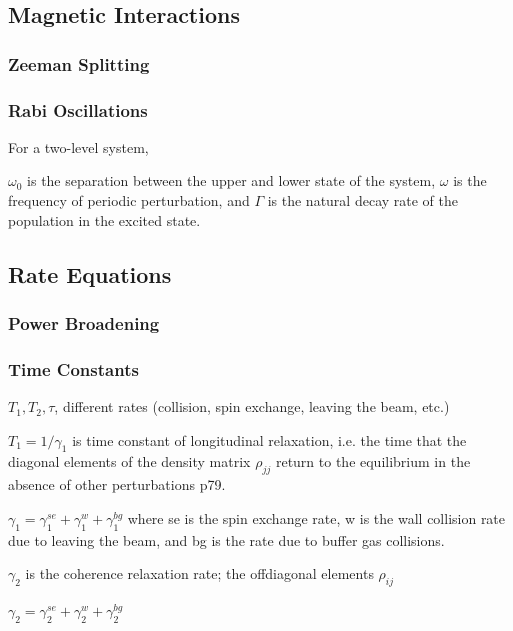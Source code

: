 \subsection{Magnetic Interactions}

\subsubsection{Zeeman Splitting}



\subsubsection{Rabi Oscillations}

For a two-level system, 

$\omega_0$ is the separation between the upper and lower state of the system, $\omega$ is the frequency of periodic perturbation, and $\Gamma$ is the natural decay rate of the population in the excited state.

\subsection{Rate Equations}

\subsubsection{Power Broadening}

\subsubsection{Time Constants}

$T_1, T_2, \tau$, different rates (collision, spin exchange, leaving the beam, etc.)

$T_1 = 1/\gamma_1$ is time constant of longitudinal relaxation,
i.e. the time that the diagonal elements of the density matrix $\rho_{jj}$
return to the equilibrium in the absence of other perturbations
\cite{vanier} p79.

$\gamma_1 = \gamma_1^{se} + \gamma_1^{w} + \gamma_1^{bg} $
where se is the spin exchange rate, w is the wall collision rate due to leaving the beam, and bg is the rate due to buffer gas collisions.


$\gamma_2$ is the coherence relaxation rate; the offdiagonal elements $\rho_{ij}$

$\gamma_2 = \gamma_2^{se} + \gamma_2^{w} + \gamma_2^{bg}$

